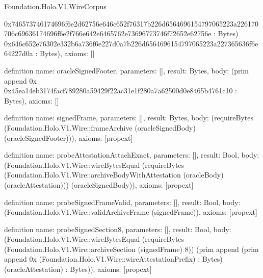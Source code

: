 \begin{lexlean}{Foundation.Holo.V1.WireCorpus}
\begin{semanticmodule}
{0x746573746174696f6e2d62756e646c652f76317b226d6564696154797065223a226170706c69636174696f6e2f766e642e6465762e73696773746f72652e62756e : Bytes) 0x646c652e76302e332b6a736f6e227d0a7b226d6564696154797065223a227365636f6e64227d0a : Bytes),
  axioms: []
}

definition{
  name: oracleSignedFooter,
  parameters: [],
  result: Bytes,
  body: (prim append 0x 0x45ea14eb3174facf789280a59429f22ac31e1f280a7a62500d0e8465b4761c10 : Bytes),
  axioms: []
}

definition{
  name: signedFrame,
  parameters: [],
  result: Bytes,
  body: (requireBytes (Foundation.Holo.V1.Wire::frameArchive (oracleSignedBody) (oracleSignedFooter))),
  axioms: [propext]
}

definition{
  name: probeAttestationAttachExact,
  parameters: [],
  result: Bool,
  body: (Foundation.Holo.V1.Wire::wireBytesEqual (requireBytes (Foundation.Holo.V1.Wire::archiveBodyWithAttestation (oracleBody) (oracleAttestation))) (oracleSignedBody)),
  axioms: [propext]
}

definition{
  name: probeSignedFrameValid,
  parameters: [],
  result: Bool,
  body: (Foundation.Holo.V1.Wire::validArchiveFrame (signedFrame)),
  axioms: [propext]
}

definition{
  name: probeSignedSection8,
  parameters: [],
  result: Bool,
  body: (Foundation.Holo.V1.Wire::wireBytesEqual (requireBytes (Foundation.Holo.V1.Wire::archiveSection (signedFrame) 8)) (prim append (prim append 0x (Foundation.Holo.V1.Wire::wireAttestationPrefix) : Bytes) (oracleAttestation) : Bytes)),
  axioms: [propext]
}


\end{semanticmodule}
\end{lexlean}
